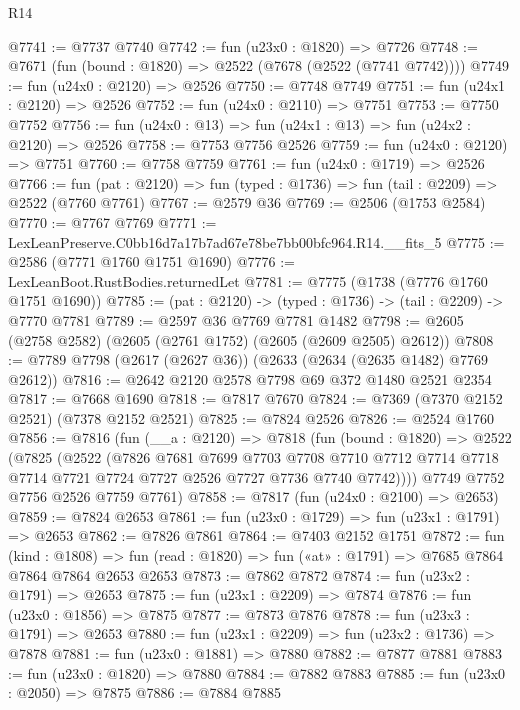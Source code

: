 \begin{lexlean}{R14}
\begin{coremodule}
@7741 := @7737 @7740
@7742 := fun (u23x0 : @1820) => @7726
@7748 := @7671 (fun (bound : @1820) => @2522 (@7678 (@2522 (@7741 @7742))))
@7749 := fun (u24x0 : @2120) => @2526
@7750 := @7748 @7749
@7751 := fun (u24x1 : @2120) => @2526
@7752 := fun (u24x0 : @2110) => @7751
@7753 := @7750 @7752
@7756 := fun (u24x0 : @13) => fun (u24x1 : @13) => fun (u24x2 : @2120) => @2526
@7758 := @7753 @7756 @2526
@7759 := fun (u24x0 : @2120) => @7751
@7760 := @7758 @7759
@7761 := fun (u24x0 : @1719) => @2526
@7766 := fun (pat : @2120) => fun (typed : @1736) => fun (tail : @2209) => @2522 (@7760 @7761)
@7767 := @2579 @36
@7769 := @2506 (@1753 @2584)
@7770 := @7767 @7769
@7771 := LexLeanPreserve.C0bb16d7a17b7ad67e78be7bb00bfc964.R14.__fits_5
@7775 := @2586 (@7771 @1760 @1751 @1690)
@7776 := LexLeanBoot.RustBodies.returnedLet
@7781 := @7775 (@1738 (@7776 @1760 @1751 @1690))
@7785 := (pat : @2120) -> (typed : @1736) -> (tail : @2209) -> @7770 @7781
@7789 := @2597 @36 @7769 @7781 @1482
@7798 := @2605 (@2758 @2582) (@2605 (@2761 @1752) (@2605 (@2609 @2505) @2612))
@7808 := @7789 @7798 (@2617 (@2627 @36)) (@2633 (@2634 (@2635 @1482) @7769 @2612))
@7816 := @2642 @2120 @2578 @7798 @69 @372 @1480 @2521 @2354
@7817 := @7668 @1690
@7818 := @7817 @7670
@7824 := @7369 (@7370 @2152 @2521) (@7378 @2152 @2521)
@7825 := @7824 @2526
@7826 := @2524 @1760
@7856 := @7816
    (fun (__a : @2120) =>
    @7818
      (fun (bound : @1820) =>
      @2522
        (@7825
          (@2522
            (@7826
              @7681
              @7699
              @7703
              @7708
              @7710
              @7712
              @7714
              @7718
              @7714
              @7721
              @7724
              @7727
              @2526
              @7727
              @7736
              @7740
              @7742))))
      @7749
      @7752
      @7756
      @2526
      @7759
      @7761)
@7858 := @7817 (fun (u24x0 : @2100) => @2653)
@7859 := @7824 @2653
@7861 := fun (u23x0 : @1729) => fun (u23x1 : @1791) => @2653
@7862 := @7826 @7861
@7864 := @7403 @2152 @1751
@7872 := fun (kind : @1808) =>
  fun (read : @1820) => fun («at» : @1791) => @7685 @7864 @7864 @7864 @2653 @2653
@7873 := @7862 @7872
@7874 := fun (u23x2 : @1791) => @2653
@7875 := fun (u23x1 : @2209) => @7874
@7876 := fun (u23x0 : @1856) => @7875
@7877 := @7873 @7876
@7878 := fun (u23x3 : @1791) => @2653
@7880 := fun (u23x1 : @2209) => fun (u23x2 : @1736) => @7878
@7881 := fun (u23x0 : @1881) => @7880
@7882 := @7877 @7881
@7883 := fun (u23x0 : @1820) => @7880
@7884 := @7882 @7883
@7885 := fun (u23x0 : @2050) => @7875
@7886 := @7884 @7885

\end{coremodule}
\end{lexlean}
